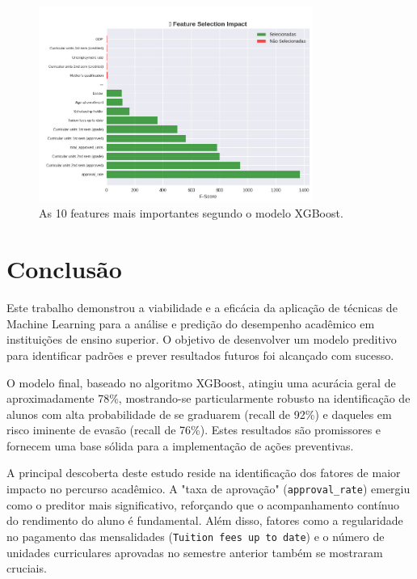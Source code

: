 \documentclass[12pt]{article}
\begin{document}
\begin{figure}[h!]
\centering
\includegraphics[width=0.8\textwidth]{images/feature_importance.jpg}
\caption{As 10 features mais importantes segundo o modelo XGBoost.}
\label{fig:feature_importance}
\end{figure}

\clearpage
\section{Conclusão}
Este trabalho demonstrou a viabilidade e a eficácia da aplicação de técnicas de Machine Learning para a análise e predição do desempenho acadêmico em instituições de ensino superior. O objetivo de desenvolver um modelo preditivo para identificar padrões e prever resultados futuros foi alcançado com sucesso.

O modelo final, baseado no algoritmo XGBoost, atingiu uma acurácia geral de aproximadamente 78\%, mostrando-se particularmente robusto na identificação de alunos com alta probabilidade de se graduarem (recall de 92\%) e daqueles em risco iminente de evasão (recall de 76\%). Estes resultados são promissores e fornecem uma base sólida para a implementação de ações preventivas.

A principal descoberta deste estudo reside na identificação dos fatores de maior impacto no percurso acadêmico. A "taxa de aprovação" (\texttt{approval\_rate}) emergiu como o preditor mais significativo, reforçando que o acompanhamento contínuo do rendimento do aluno é fundamental. Além disso, fatores como a regularidade no pagamento das mensalidades (\texttt{Tuition fees up to date}) e o número de unidades curriculares aprovadas no semestre anterior também se mostraram cruciais.
\end{document}
